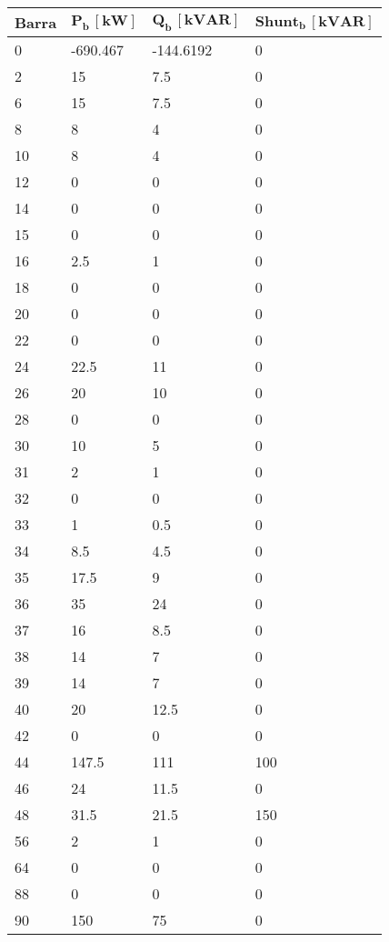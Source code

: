 \begin{tabular}{llll}
\toprule
\textbf{Barra}&\textbf{$\mathbf{P_b\,[kW]}$}&\textbf{$\mathbf{Q_b\,[kVAR]}$}&\textbf{$\mathbf{Shunt_b\,[kVAR]}$}\\
\midrule
0&-690.467&-144.6192&0\\
2&15&7.5&0\\
6&15&7.5&0\\
8&8&4&0\\
10&8&4&0\\
12&0&0&0\\
14&0&0&0\\
15&0&0&0\\
16&2.5&1&0\\
18&0&0&0\\
20&0&0&0\\
22&0&0&0\\
24&22.5&11&0\\
26&20&10&0\\
28&0&0&0\\
30&10&5&0\\
31&2&1&0\\
32&0&0&0\\
33&1&0.5&0\\
34&8.5&4.5&0\\
35&17.5&9&0\\
36&35&24&0\\
37&16&8.5&0\\
38&14&7&0\\
39&14&7&0\\
40&20&12.5&0\\
42&0&0&0\\
44&147.5&111&100\\
46&24&11.5&0\\
48&31.5&21.5&150\\
56&2&1&0\\
64&0&0&0\\
88&0&0&0\\
90&150&75&0\\
\bottomrule
\end{tabular}
